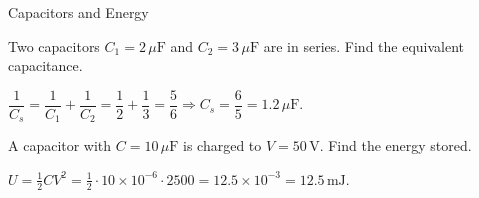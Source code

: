 \begin{KnowledgePoint}{Capacitors and Energy \Core}
  \KPProblems
\begin{cheatproblem}
  Two capacitors $C_1=2\,\mu\text{F}$ and $C_2=3\,\mu\text{F}$ are in series. Find the equivalent capacitance.
\begin{solutionbox}
  $\dfrac{1}{C_s}=\dfrac{1}{C_1}+\dfrac{1}{C_2}=\dfrac{1}{2}+\dfrac{1}{3}=\dfrac{5}{6}\Rightarrow C_s=\dfrac{6}{5}=1.2\,\mu\text{F}$.
\end{solutionbox}
\end{cheatproblem}
\begin{cheatproblem}
  A capacitor with $C=10\,\mu\text{F}$ is charged to $V=50\,\text{V}$. Find the energy stored.
\begin{solutionbox}
  $U=\tfrac12 CV^2=\tfrac12\cdot10\times10^{-6}\cdot2500=12.5\times10^{-3}=12.5\,\text{mJ}$.
\end{solutionbox}
\end{cheatproblem}
\end{KnowledgePoint}

